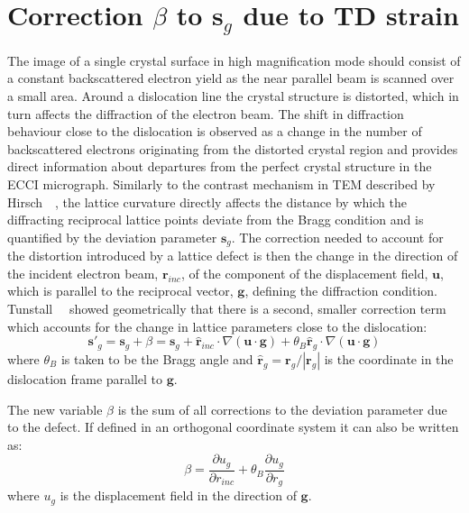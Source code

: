 \section{Correction \texorpdfstring{$\beta$}{beta} to \texorpdfstring{$\mathbf{s}_g$}{sg} due to TD strain}
\label{sec:beta}
The image of a single crystal surface in high magnification mode should consist of a constant backscattered electron yield as the near parallel beam is scanned over a small area. Around a dislocation line the crystal structure is distorted, which in turn affects the diffraction of the electron beam. The shift in diffraction behaviour close to the dislocation is observed as a change in the number of backscattered electrons originating from the distorted crystal region and provides direct information about departures from the perfect crystal structure in the ECCI micrograph. Similarly to the contrast mechanism in TEM described by Hirsch~\etal~\cite{Hirsch60}, the lattice curvature directly affects the distance by which the diffracting reciprocal lattice points deviate from the Bragg condition and is quantified by the deviation parameter $\mathbf{s}_g$. The correction needed to account for the distortion introduced by a lattice defect is then the change in the direction of the incident electron beam, $\mathbf{r}_{inc}$, of the component of the displacement field, $\mathbf{u}$, which is parallel to the reciprocal vector, $\mathbf{g}$, defining the diffraction condition. Tunstall~\etal~\cite{Tunstall64} showed geometrically that there is a second, smaller correction term which accounts for the change in lattice parameters close to the dislocation:
\begin{equation}
\label{eq:tunstall}
    \mathbf{s}'_g = \mathbf{s}_g + \beta = \mathbf{s}_g + \mathbf{\hat{r}}_{inc} \cdot \nabla(\mathbf{u} \cdot \mathbf{g}) + \theta_B \mathbf{\hat{r}}_{g} \cdot \nabla(\mathbf{u} \cdot \mathbf{g} )
\end{equation}
where $\theta_B$ is taken to be the Bragg angle and $\mathbf{\hat{r}}_{g}=\mathbf{r}_g/ |\mathbf{r}_g|$  is the coordinate in the dislocation frame parallel to $\mathbf{g}$.

The new variable $\beta$ is the sum of all corrections to the deviation parameter due to the defect. If defined in an orthogonal coordinate system it can also be written as:
\begin{equation}
\label{eq:beta}
    \beta = \frac{\partial u_g}{\partial r_{inc}} + \theta_B\frac{\partial u_g}{\partial r_g}
\end{equation}
where $u_g$ is the displacement field in the direction of $\mathbf{g}$.

